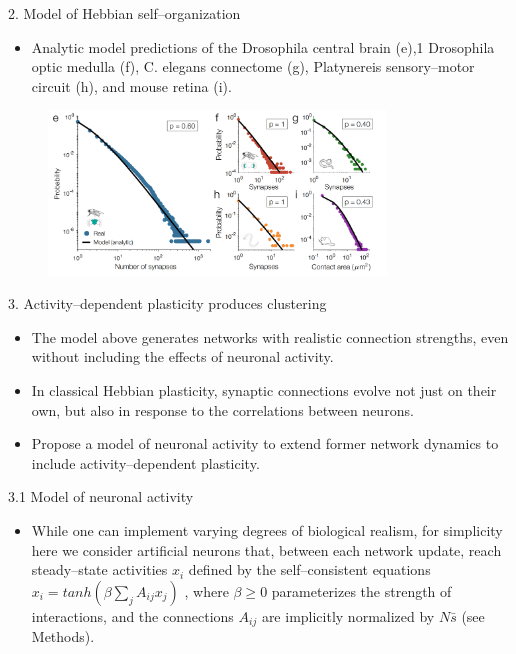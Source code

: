 \documentclass[
  notheorems,
  aspectratio=54,
]{beamer}
\begin{document}
\begin{frame}{2. Model of Hebbian self–organization}
  \begin{itemize}
    \item Analytic model predictions of the
Drosophila central brain (e),1 Drosophila optic medulla (f), C. elegans connectome (g), Platynereis
sensory–motor circuit (h), and mouse retina (i).
  \end{itemize}
  \begin{figure}
    \centering
    \includegraphics[width=0.8\textwidth]{./screenshot/7.png}
  \end{figure}
\end{frame}

\begin{frame}{3. Activity–dependent plasticity produces clustering}
  \begin{itemize}
    \item The model above generates networks with realistic connection strengths, even without including the effects of neuronal activity.
    \item In classical Hebbian plasticity, synaptic connections evolve not just on their own, but also in response to the correlations between neurons.
    \item Propose a model of neuronal activity to extend former network dynamics to include activity–dependent plasticity.
  \end{itemize}
\end{frame}

\begin{frame}{3.1 Model of neuronal activity}
  \begin{itemize}
    \item While
      one can implement varying degrees of biological realism, for simplicity here we consider artificial neurons that, between each network update, reach steady–state activities $x_{i}$ defined by
      the self–consistent equations $x_{i} = tanh(\beta\sum_{j}{A_{ij}x_{j}}) $
      , where $\beta \geq 0$ parameterizes the strength
      of interactions, and the connections $A_{ij}$ are implicitly normalized by $N\bar{s}$ (see Methods).
  \end{itemize}
\end{frame}
\end{document}
